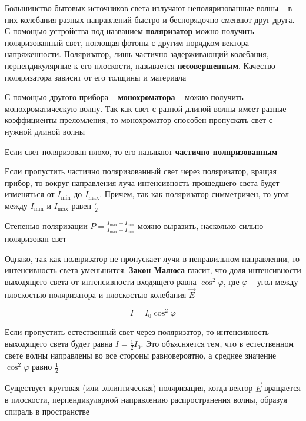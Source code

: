 \documentclass[12pt]{article}
\begin{document}
Большинство бытовых источников света излучают неполяризованные волны -- в них колебания разных направлений быстро и беспорядочно сменяют друг друга. С помощью устройства под названием \textbf{поляризатор} можно получить поляризованный свет, поглощая фотоны с другим порядком вектора напряженности. Поляризатор, лишь частично задерживающий колебания, перпендикулярные к его плоскости, называется \textbf{несовершенным}. Качество поляризатора зависит от его толщины и материала

С помощью другого прибора -- \textbf{монохроматора} -- можно получить монохроматическую волну. Так как свет с разной длиной волны имеет разные коэффициенты преломления, то монохроматор способен пропускать свет с нужной длиной волны

Если свет поляризован плохо, то его называют \textbf{частично поляризованным}


Если пропустить частично поляризованный свет через поляризатор, вращая прибор, то вокруг направления луча интенсивность прошедшего света будет изменяться от $I_\min$ до $I_\max$. Причем, так как поляризатор симметричен, то угол между $I_\min$ и $I_\max$ равен $\frac{\pi}{2}$

Степенью поляризации $P = \frac{I_{\max} - I_\min}{I_{\max} + I_\min}$ можно выразить, насколько сильно поляризован свет 

\mediumvspace

Однако, так как поляризатор не пропускает лучи в неправильном направлении, то интенсивность света уменьшится. \textbf{Закон Малюса} гласит, что доля интенсивности выходящего света от интенсивности входящего равна $\cos^2 \varphi$, где $\varphi$ -- угол между плоскостью поляризатора и плоскостью колебания $\vec E$

\[I = I_0 \cos^2 \varphi\]

Если пропустить естественный свет через поляризатор, то интенсивность выходящего света будет равна $I = \frac{1}{2} I_0$. Это объясняется тем, что в естественном свете волны направлены во все стороны равновероятно, а среднее значение $\cos^2 \varphi$ равно $\frac{1}{2}$

\mediumvspace

Существует круговая (или эллиптическая) поляризация, когда вектор $\vec E$ вращается в плоскости, перпендикулярной направлению распространения волны, образуя спираль в пространстве

\end{document}
